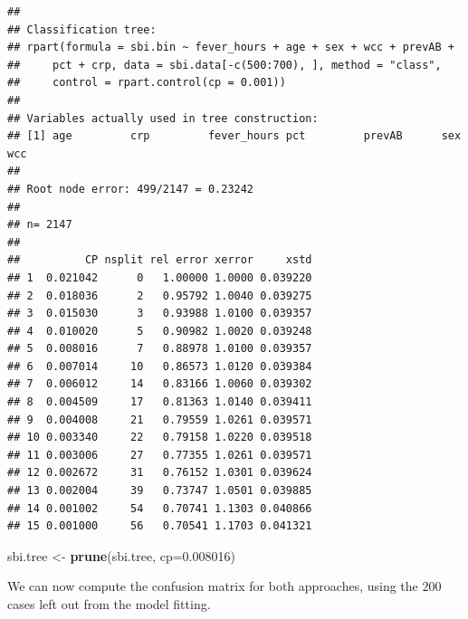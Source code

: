 \documentclass[
]{book}
\newenvironment{Shaded}{\begin{snugshade}}{\end{snugshade}}
\newcommand{\AttributeTok}[1]{\textcolor[rgb]{0.13,0.29,0.53}{#1}}
\newcommand{\CommentTok}[1]{\textcolor[rgb]{0.56,0.35,0.01}{\textit{#1}}}
\newcommand{\DecValTok}[1]{\textcolor[rgb]{0.00,0.00,0.81}{#1}}
\newcommand{\FloatTok}[1]{\textcolor[rgb]{0.00,0.00,0.81}{#1}}
\newcommand{\FunctionTok}[1]{\textcolor[rgb]{0.13,0.29,0.53}{\textbf{#1}}}
\newcommand{\NormalTok}[1]{#1}
\newcommand{\OtherTok}[1]{\textcolor[rgb]{0.56,0.35,0.01}{#1}}
\newcommand{\SpecialCharTok}[1]{\textcolor[rgb]{0.81,0.36,0.00}{\textbf{#1}}}
\newcommand{\StringTok}[1]{\textcolor[rgb]{0.31,0.60,0.02}{#1}}
\begin{document}
\begin{verbatim}
## 
## Classification tree:
## rpart(formula = sbi.bin ~ fever_hours + age + sex + wcc + prevAB + 
##     pct + crp, data = sbi.data[-c(500:700), ], method = "class", 
##     control = rpart.control(cp = 0.001))
## 
## Variables actually used in tree construction:
## [1] age         crp         fever_hours pct         prevAB      sex         wcc        
## 
## Root node error: 499/2147 = 0.23242
## 
## n= 2147 
## 
##          CP nsplit rel error xerror     xstd
## 1  0.021042      0   1.00000 1.0000 0.039220
## 2  0.018036      2   0.95792 1.0040 0.039275
## 3  0.015030      3   0.93988 1.0100 0.039357
## 4  0.010020      5   0.90982 1.0020 0.039248
## 5  0.008016      7   0.88978 1.0100 0.039357
## 6  0.007014     10   0.86573 1.0120 0.039384
## 7  0.006012     14   0.83166 1.0060 0.039302
## 8  0.004509     17   0.81363 1.0140 0.039411
## 9  0.004008     21   0.79559 1.0261 0.039571
## 10 0.003340     22   0.79158 1.0220 0.039518
## 11 0.003006     27   0.77355 1.0261 0.039571
## 12 0.002672     31   0.76152 1.0301 0.039624
## 13 0.002004     39   0.73747 1.0501 0.039885
## 14 0.001002     54   0.70741 1.1303 0.040866
## 15 0.001000     56   0.70541 1.1703 0.041321
\end{verbatim}

\begin{Shaded}
\begin{Highlighting}[]
\NormalTok{sbi.tree }\OtherTok{\textless{}{-}} \FunctionTok{prune}\NormalTok{(sbi.tree, }\AttributeTok{cp=}\FloatTok{0.008016}\NormalTok{)}
\end{Highlighting}
\end{Shaded}

We can now compute the confusion matrix for both approaches, using the
200 cases left out from the model fitting.

\begin{Shaded}
\end{Shaded}
\end{document}
